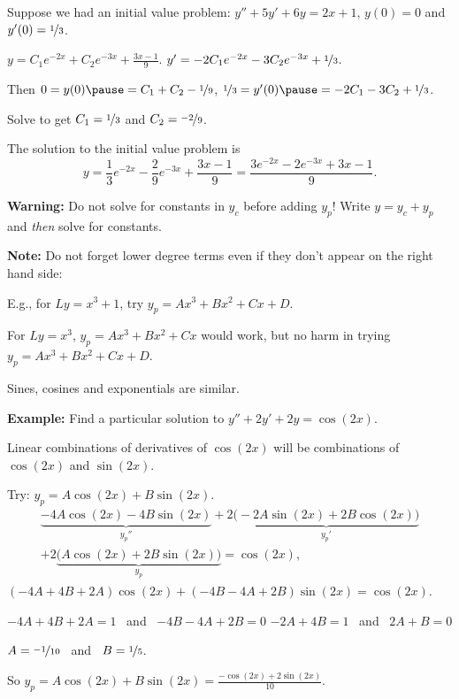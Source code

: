 \documentclass[10pt,aspectratio=169]{beamer}
\begin{document}
\begin{frame}
Suppose we had an initial value problem:
\quad $y'' + 5y'+ 6y = 2x+1$, \quad
$y(0) = 0$ and $y'(0) = \nicefrac{1}{3}$.

\medskip
\pause

\quad $y = C_1 e^{-2x} + C_2 e^{-3x} + \frac{3x-1}{9}$.
\qquad
\pause
$y' = - 2C_1 e^{-2x} - 3C_2 e^{-3x} + \nicefrac{1}{3}$.

\medskip
\pause
Then
$0 = y(0) \pause = C_1 + C_2 -\nicefrac{1}{9}$, \pause \qquad
$\nicefrac{1}{3} = y'(0) \pause = - 2C_1 - 3C_2 + \nicefrac{1}{3}$.
\medskip
\pause

Solve to get $C_1 = \nicefrac{1}{3}$ and $C_2 = \nicefrac{-2}{9}$.

\medskip
\pause

The solution to the initial value problem is
\[
y = \frac{1}{3} e^{-2x} - \frac{2}{9} e^{-3x} + \frac{3x-1}{9} =
\frac{3 e^{-2x} - 2 e^{-3x} + 3x-1}{9} .
\]
\pause

\textbf{Warning:}
Do not solve for constants in $y_c$ before adding $y_p$!
Write $y=y_c+y_p$ and \textit{then} solve for constants.

\medskip
\pause

\textbf{Note:}
Do not forget lower degree terms even if they don't appear on the right
hand side:

\medskip

E.g., for \quad $Ly = x^3+1$, \quad try $y_p = Ax^3+Bx^2+Cx+D$.

\medskip
\pause

For $Ly = x^3$, $y_p = Ax^3+Bx^2+Cx$ would work,
but no harm in trying $y_p = Ax^3+Bx^2+Cx+D$.
\end{frame}

\begin{frame}
Sines, cosines and exponentials are similar.

\pause
\medskip

\textbf{Example:}
Find a particular solution to
\quad
$y''+2y'+2y = \cos (2x)$.

\medskip
\pause

Linear combinations of derivatives of $\cos(2x)$ will be combinations
of $\cos (2x)$ and $\sin (2x)$.

\medskip
\pause

Try:
\quad
$y_p = A \cos (2x) + B \sin (2x)$.
\pause
\begin{multline*}
\underbrace{-4 A \cos (2x) - 4 B \sin (2x)}_{y_p''}
+2 \underbrace{\bigl(-2A \sin (2x) + 2B \cos (2x)\bigr)}_{y_p'}
\\
+
2 \underbrace{\bigl(A \cos (2x) + 2B \sin (2x)\bigr)}_{y_p}
= \cos (2x) ,
\end{multline*}
\pause
\thus\quad
$(-4A+4B+2A) \cos(2x) +
(-4B-4A+2B) \sin(2x)
= \cos(2x)$.

\medskip
\pause
\thus \quad $-4A + 4B + 2A = 1$ ~and~
$-4B - 4A + 2B = 0$
\pause
\wthus
$-2A+4B =1$ ~and~ $2A+B=0$

\pause
\thus
\quad
$A=\nicefrac{-1}{10}$ ~and~ $B=\nicefrac{1}{5}$.

\medskip
\pause

So \quad
$\displaystyle
y_p = A \cos (2x) + B \sin (2x) = \frac{-\cos (2x) + 2 \sin (2x)}{10} .
$
\end{frame}
\end{document}

